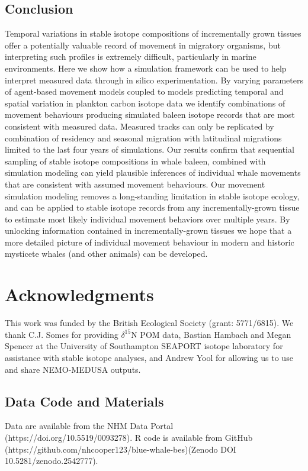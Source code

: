 \documentclass[a4paper,12pt]{article}
\begin{document}
\subsection{Conclusion}
Temporal variations in stable isotope compositions of incrementally grown tissues offer a potentially valuable record of movement in migratory organisms, but interpreting such profiles is extremely difficult, particularly in marine environments. 
Here we show how a simulation framework can be used to help interpret measured data through in silico experimentation. By varying parameters of agent-based movement models coupled to models predicting temporal and spatial variation in plankton carbon isotope data we identify combinations of movement behaviours producing simulated baleen isotope records that are most consistent with measured data.
Measured tracks can only be replicated by combination of residency and seasonal migration with latitudinal migrations limited to the last four years of simulations. 
Our results confirm that sequential sampling of stable isotope compositions in whale baleen, combined with simulation modeling can yield plausible inferences of individual whale movements that are consistent with assumed movement behaviours. 
Our movement simulation modeling removes a long-standing limitation in stable isotope ecology, and can be applied to stable isotope records from any incrementally-grown tissue to estimate most likely individual movement behaviors over multiple years. 
By unlocking information contained in incrementally-grown tissues we hope that a more detailed picture of individual movement behaviour in modern and historic mysticete whales (and other animals) can be developed.

\section{Acknowledgments}\label{acknowledgments}
This work was funded by the British Ecological Society (grant: 5771/6815). 
We thank C.J. Somes for providing $\delta^{15}$N POM data, Bastian Hambach and Megan Spencer at the University of Southampton SEAPORT isotope laboratory for assistance with stable isotope analyses, and Andrew Yool for allowing us to use and share NEMO-MEDUSA outputs.


%


\subsection{Data Code and Materials}\label{data-code-and-materials}
Data are available from the NHM Data Portal (https://doi.org/10.5519/0093278). 
R code is available from GitHub (https://github.com/nhcooper123/blue-whale-bes)(Zenodo DOI 10.5281/zenodo.2542777).
\end{document}
